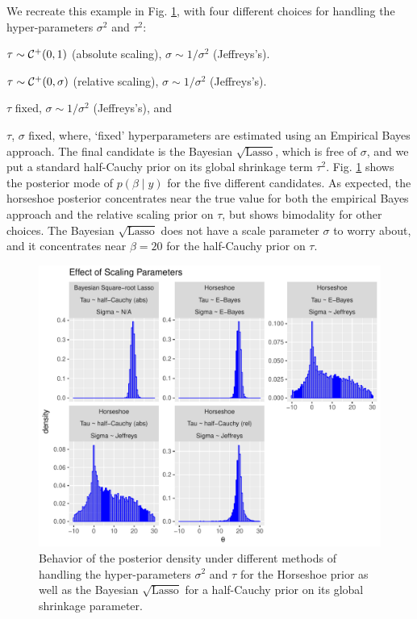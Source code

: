 \documentclass[10pt]{article}
\def\sql{$\sqrt{\text{Lasso}}$}
\begin{document}
We recreate this example in Fig. \ref{fig:effect-sigma}, with four different choices for handling the hyper-parameters $\sigma^2$ and $\tau^2$: 
\ben 
\item $\tau \sim \mathcal{C}^+(0,1)$ (absolute scaling), $\sigma \sim 1/\sigma^2$ (Jeffreys's). 
\item $\tau \sim \mathcal{C}^+(0,\sigma)$ (relative scaling), $\sigma \sim 1/\sigma^2$ (Jeffreys's). 
\item $\tau$ fixed, $\sigma \sim 1/\sigma^2$ (Jeffreys's), and
\item $\tau$, $\sigma$ fixed, 
\een
where, `fixed' hyperparameters are estimated using an Empirical Bayes approach. The final candidate is the Bayesian \sql{}, which is free of $\sigma$, and we put a standard half-Cauchy prior on its global shrinkage term $\tau^2$. Fig. \ref{fig:effect-sigma} shows the posterior mode of $p(\beta \mid y)$ for the five different candidates. As expected, the horseshoe posterior concentrates near the true value for both the empirical Bayes approach and the relative scaling prior on $\tau$, but shows bimodality for other choices. The Bayesian \sql{} does not have a scale parameter $\sigma$ to worry about, and it concentrates near $\beta = 20$ for the half-Cauchy prior on $\tau$. 

\begin{figure}[!ht]%
\centering
\includegraphics[width=0.9\columnwidth]{art/effect_of_sigma}%
\caption{Behavior of the posterior density under different methods of handling the hyper-parameters $\sigma^2$ and $\tau$ for the Horseshoe prior as well as the Bayesian \sql{} for a half-Cauchy prior on its global shrinkage parameter. }%
\label{fig:effect-sigma}%
\end{figure}
\end{document}
